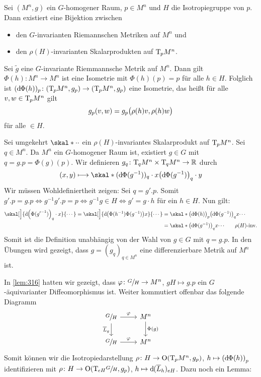 \begin{lemma}[{name=[Bijektion $G$-inv. Metriken und $\rho(H)$-inv. Skalarprodukte]},label=lem:3111]
	Sei $(M^n,g)$ ein $G$-homogener Raum, $p \in M^n$ und $H$ die Isotropiegruppe von $p$.
	Dann existiert eine Bijektion zwischen
	\begin{itemize}
		\item den $G$-invarianten Riemannschen Metriken auf $M^n$ und
		\item den $\rho(H)$-invarianten Skalarprodukten auf $\Tmap_p M^n$.
	\end{itemize}
\end{lemma}
\begin{beweis}
	Sei $\tilde{g}$ eine $G$-invariante Riemmannsche Metrik auf $M^n$.
	Dann gilt $\Phi(h) \colon M^n \to M^n$ ist eine Isometrie mit $\Phi(h)(p)=p$ für alle $h \in H$.
	Folglich ist $(\mathd \Phi(h))_p \colon \enbrace*{\Tmap_p M^n, g_p} \to \enbrace*{\Tmap_p M^n, g_p}$ eine Isometrie, das heißt für alle $v,w \in \Tmap_p M^n$ gilt
	\[
		g_p(v,w) = g_p \enbrace[\big]{\rho(h)v, \rho(h)w}
	\]
	für alle $ \in H$.
	
	Sei umgekehrt $\skal*{\cdot}{\cdot}$ ein $\rho(H)$-invariantes Skalarprodukt auf $\Tmap_p M^n$.
	Sei $q \in M^n$.
	Da $M^n$ ein $G$-homogener Raum ist, existiert $g \in G$ mit $q = g.p = \Phi(g)(p)$.
	Wir definieren $g_q \colon \Tmap_q M^n \times \Tmap_q M^n \to \mathbb{R}$ durch
	\[
		(x,y) \longmapsto \skal*{(\mathd\Phi(g^{-1}))_q \cdot x}{\enbrace*{\mathd\Phi(g^{-1})}_q \cdot y}
	\]
	Wir müssen Wohldefiniertheit zeigen: Sei $q = g' .p$.
	Somit $g'.p = g.p \iff g^{-1} g' .p =p \iff g^{-1} g \in H \iff g' = g \cdot h$ für ein $h \in H$. 
	Nun gilt:
	\begin{align}
		\skal[\Big]{\mathd \enbrace*{\Phi({g'}^{-1})}_q \cdot x}{\cdots} = \skal[\Big]{\mathd \enbrace*{\Phi(h^{-1}) \Phi(g^{-1})}x }{ \cdots} &= \skal*{ \enbrace[\big]{\mathd \Phi(h)}_p \enbrace[\big]{\mathd \Phi(g^{-1})}_q x}{ \cdots} \\
		&= \skal*{\enbrace*{\mathd \Phi (g^{-1})}_q x}{ \cdots} \tag*{$\rho(H)$-inv.}
	\end{align}
	Somit ist die Definition unabhängig von der Wahl von $g \in G$ mit $q=g.p$.
	In den Übungen wird gezeigt, dass $g=(g_q)_{q \in M^n}$ eine differenzierbare Metrik auf $M^n$ ist.
\end{beweis}

In \autoref{lem:316} hatten wir gezeigt, dass $\varphi \colon \sfrac{G}{H} \to M^n$, $g H \mapsto g .p$ ein $G$-äquivarianter Diffeomorphismus ist.
Weiter kommutiert offenbar das folgende Diagramm
\[
	\begin{tikzcd}
		\sfrac{G}{H} \dar["\overline{L}_g"'] \rar["\varphi"] & M^n \dar["\Phi(g)"] \\
		\sfrac{G}{H} \rar["\varphi"] & M^n
	\end{tikzcd}
\]
Somit können wir die Isotropiedarstellung $\rho \colon H \to \On \enbrace*{\Tmap_p M^n, g_p}$, $h \mapsto \enbrace*{\mathd\Phi(h)}_p$ identifizieren mit $\rho \colon H \to \On \enbrace*{\Tmap_{eH} \sfrac{G}{H},g_p}$, $h \mapsto \mathd (\overline{L}_h)_{eH}$.
Dazu noch ein Lemma:

